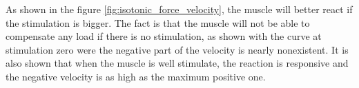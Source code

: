 \documentclass{cmc}
\begin{document}
As shown in the figure \ref{fig:isotonic_force_velocity}, the muscle will better react if the stimulation is bigger. The fact is that the muscle will not be able to compensate any load if there is no stimulation, as shown with the curve at stimulation zero were the negative part of the velocity is nearly nonexistent. It is also shown that when the muscle is well stimulate, the reaction is responsive and the negative velocity is as high as the maximum positive one.
  
\end{document}
